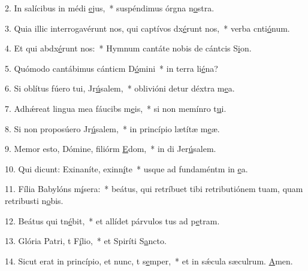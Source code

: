 2. In salícibus in médi \uline{e}jus,~* suspéndimus órgna n\uline{o}stra.\par 
3. Quia illic interrogavérunt nos, qui captívos dx\uline{é}runt nos,~* verba cnti\uline{ó}num.\par 
4. Et qui abdx\uline{é}runt nos:~* Hymnum cantáte nobis de cántcis S\uline{i}on.\par 
5. Quómodo cantábimus cánticm D\uline{ó}mini~* in terra li\uline{é}na?\par 
6. Si oblítus fúero tui, Jr\uline{ú}salem,~* oblivióni detur déxtra m\uline{e}a.\par 
7. Adhǽreat lingua mea fáucibs m\uline{e}is,~* si non memínro t\uline{u}i.\par 
8. Si non proposúero Jr\uline{ú}salem,~* in princípio lætítæ m\uline{e}æ.\par 
9. Memor esto, Dómine, filiórm \uline{E}dom,~* in di Jer\uline{ú}salem.\par 
10. Qui dicunt: Exinaníte, exinn\uline{í}te~* usque ad fundaméntm in \uline{e}a.\par 
11. Fília Babylóns m\uline{í}sera:~* beátus, qui retríbuet tibi retributiónem tuam, quam retribusti n\uline{o}bis.\par 
12. Beátus qui tn\uline{é}bit,~* et allídet párvulos tus ad p\uline{e}tram.\par 
13. Glória Patri, t F\uline{í}lio,~* et Spiríti S\uline{a}ncto.\par 
14. Sicut erat in princípio, et nunc, t s\uline{e}mper,~* et in sǽcula sæculrum. \uline{A}men.\par 
